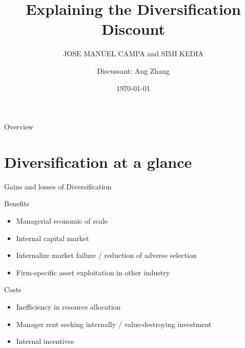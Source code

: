 \documentclass[aspectratio=169,xcolor=dvipsnames]{beamer}
\title{Explaining the Diversification Discount}
\subtitle{JOSE MANUEL CAMPA and SIMI KEDIA}
\author{Discussant: Ang Zhang}
\date{\today} %
\begin{document}
\begin{frame}
    \titlepage
\end{frame}

\begin{frame}{Overview}
    \tableofcontents
\end{frame}

\section{Diversification at a glance}

\begin{frame}{Gains and losses of Diversification}
    \begin{block}{Benefits}
        \begin{itemize}
            \item Managerial economic of scale
            \item Internal capital market
            \item Internalize market failure / reduction of adverse selection
            \item Firm-specific asset exploitation in other industry
        \end{itemize}

    \end{block}
    \begin{block}{Costs}
        \begin{itemize}
            \item Inefficiency in resource allocation
            \item Manager rent seeking internally / value-destroying investment
            \item Internal incentives
        \end{itemize}

    \end{block}
\end{frame}
\end{document}
